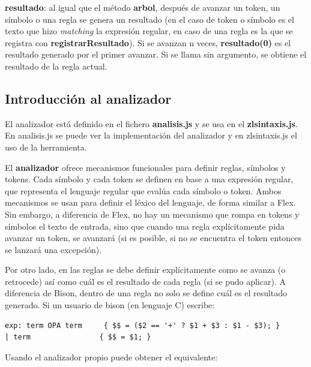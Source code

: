 \documentclass{report}
\begin{document}
	\vspace{10px}
	\textbf{resultado}: al igual que el método \textbf{arbol}, después de avanzar un token, un símbolo o una regla se genera un resultado (en el caso de token o símbolo es el texto que hizo \textit{matching} la expresión regular, en caso de una regla es la que se registra con \textbf{registrarResultado}). Si se avanzan n veces, \textbf{resultado(0)} es el resultado generado por el primer avanzar. Si se llama sin argumento, se obtiene el resultado de la regla actual.
	
	
	\subsection{Introducción al analizador}

	El analizador está definido en el fichero \textbf{analisis.js} y se usa en el \textbf{zlsintaxis.js}. En analisis.js se puede ver la implementación del analizador y en zlsintaxis.js el uso de la herramienta.
	
	\vspace{10px}

	El \textbf{analizador} ofrece mecanismos funcionales\cite{javascriptfunctional} para definir reglas, símbolos y tokens. Cada símbolo y cada token se definen en base a una expresión regular, que representa el lenguaje regular que evalúa cada símbolo o token. Ambos mecanismos se usan para definir el léxico del lenguaje, de forma similar a Flex. Sin embargo, a diferencia de Flex, no hay un mecanismo que rompa en tokens y símbolos el texto de entrada, sino que cuando una regla explícitamente pida avanzar un token, se avanzará (si es posible, si no se encuentra el token entonces se lanzará una excepción).
	
	\vspace{10px}
	
	Por otro lado, en las reglas se debe definir explícitamente como se avanza (o retrocede) así como cuál es el resultado de cada regla (si se pudo aplicar). A diferencia de Bison, dentro de una regla no solo se define cuál es el resultado generado. Si un usuario de bison (en lenguaje C) escribe:
	
	\begin{BVerbatim}
exp: term OPA term     { $$ = ($2 == '+' ? $1 + $3 : $1 - $3); }
| term                { $$ = $1; }
	\end{BVerbatim}
	
	Usando el analizador propio puede obtener el equivalente:
	
\end{document}
